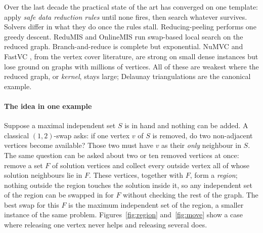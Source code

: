 \documentclass[pdflatex,sn-mathphys-num]{sn-jnl}
\theoremstyle{thmstyleone}%
\theoremstyle{thmstyletwo}%
\begin{document}
Over the last decade the practical state of the art has converged on one
template: apply \emph{safe data reduction rules} until none fires, then search
whatever survives. Solvers differ in what they do once the rules stall.
Reducing-peeling \citep{chang2017} performs one greedy descent. ReduMIS
\citep{lamm2017} and OnlineMIS \citep{dahlum2016} run swap-based local search on
the reduced graph. Branch-and-reduce \citep{akiba2016} is complete but
exponential. NuMVC \citep{cai2013numvc} and FastVC \citep{cai2017fastvc}, from the
vertex cover literature, are strong on small dense instances but lose ground on
graphs with millions of vertices. All of these are weakest where the reduced
graph, or \emph{kernel}, stays large; Delaunay triangulations are the canonical
example.

\paragraph{The idea in one example} Suppose a maximal independent set $S$ is in
hand and nothing can be added. A classical $(1,2)$-swap asks: if one vertex $v$ of
$S$ is removed, do two non-adjacent vertices become available? Those two must have
$v$ as their \emph{only} neighbour in $S$. The same question can be asked about
two or ten removed vertices at once: remove a set $F$ of solution vertices and
collect every outside vertex all of whose solution neighbours lie in $F$. These
vertices, together with $F$, form a \emph{region}; nothing outside the region
touches the solution inside it, so any independent set of the region can be swapped
in for $F$ without checking the rest of the graph. The best swap for this $F$ is
the maximum independent set of the region, a smaller instance of the same problem.
Figures~\ref{fig:region} and~\ref{fig:move} show a case where releasing one vertex
never helps and releasing several does.
\end{document}
